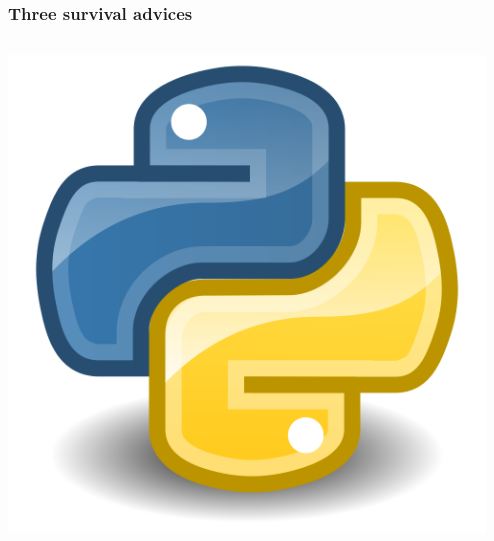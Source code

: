 \begin{frame}
    \frametitle{Three survival advices}
    \begin{columns}[c]
        \begin{column}{0.33\textwidth}
            \begin{center}
                \includegraphics[width=0.99\textwidth]{png/python_logo.png}
            \end{center}
        \end{column}
        \begin{column}{0.33\textwidth}
            \begin{center}

\end{center}
\end{column}
\end{columns}
\end{frame}
